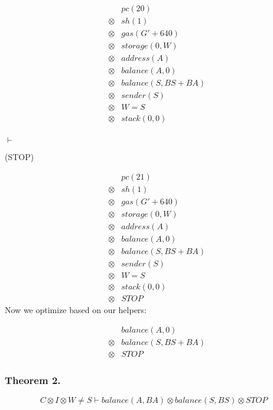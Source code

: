 \[
  \begin{array}{rcl}
    &&pc(20)\\
    &\otimes& sh(1)\\ %
    &\otimes& gas(G' + 640)\\
    &\otimes& storage(0, W)\\
    &\otimes& address(A)\\
    &\otimes& balance(A, 0)\\
    &\otimes& balance(S, BS + BA)\\
    &\otimes& sender(S)\\
    &\otimes& W = S\\
    &\otimes& stack(0, 0)\\
  \end{array}
\]

$\vdash$ \begin{flushright}(STOP)\end{flushright}

\[
  \begin{array}{rcl}
    &&pc(21)\\
    &\otimes& sh(1)\\ %
    &\otimes& gas(G' + 640)\\
    &\otimes& storage(0, W)\\
    &\otimes& address(A)\\
    &\otimes& balance(A, 0)\\
    &\otimes& balance(S, BS + BA)\\
    &\otimes& sender(S)\\
    &\otimes& W = S\\
    &\otimes& stack(0, 0)\\
    &\otimes& STOP
  \end{array}
\]
Now we optimize based on our helpers:

\[
  \begin{array}{rcl}
    && balance(A, 0)\\
    &\otimes& balance(S, BS + BA)\\
    &\otimes& STOP
  \end{array}
\]




\subsubsection*{Theorem 2.}
\[
  C \otimes I \otimes W \neq S \vdash balance(A, BA) \otimes balance(S, BS) \otimes STOP
\]


